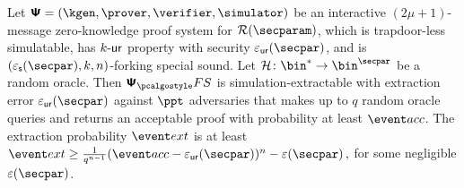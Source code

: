 \begin{theorem}
  \label{thm:se}
  Let $\ps = (\kgen, \prover, \verifier, \simulator)$ be an interactive $(2 \mu + 1)$-message
  zero-knowledge proof system for $\RELGEN(\secparam)$, which is trapdoor-less simulatable, has
  ${k\text{-}\mathsf{ur}}$ property with security $\epsur(\secpar)$, and is $(\epss(\secpar), k, n)$-forking special
  sound.  Let $\ro\colon \bin^{*} \to \bin^{\secpar}$ be a random oracle.  Then $\psfs$ is simulation-extractable with extraction error $\epsur(\secpar)$ against $\ppt$
  adversaries that makes up to $q$ random oracle queries and returns an acceptable
  proof with probability at least $\accProb$.  The extraction probability $\extProb$ is at
  least
  \( \extProb \geq \frac{1}{q^{n - 1}} (\accProb - \epsur(\secpar))^{n} -\eps(\secpar)\,, \)
  for some negligible $\eps(\secpar)$.
\end{theorem}
